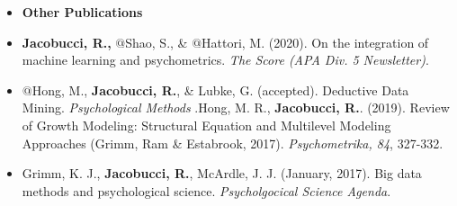 \documentclass[letterpaper,10pt]{article}
\begin{document}
\begin{itemize}
%
\vspace{3mm}
\item {\textbf{\large{Other Publications}}}
\item[] \textbf{Jacobucci, R.,} $@$Shao, S., \& $@$Hattori, M. (2020). On the integration of machine learning and psychometrics. \emph{The Score (APA Div. 5 Newsletter)}.
%
\item[] $@$Hong, M., \textbf{Jacobucci, R.}, \& Lubke, G. (accepted). Deductive Data Mining. \emph{Psychological Methods }.Hong, M. R., \textbf{Jacobucci, R.}. (2019). Review of Growth Modeling: Structural Equation and Multilevel Modeling Approaches (Grimm, Ram \& Estabrook, 2017). \emph{Psychometrika, 84}, 327-332.
%
\item[]Grimm, K. J., \textbf{Jacobucci, R.}, McArdle, J. J. (January, 2017). Big data methods and psychological science. \emph{Psycholgocical Science Agenda}.



\end{itemize}
\end{document}
